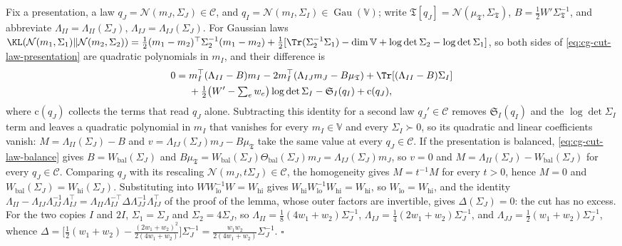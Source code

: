 Fix a presentation, a law $q_J=\mathcal N(m_J,\Sigma_J)\in\mathscr C$, and $q_I=\mathcal N(m_I,\Sigma_I)\in\operatorname{Gau}(\mathbb V)$;
write $\mathfrak T[q_J]=\mathcal N(\mu_{\mathfrak T},\Sigma_{\mathfrak T})$, $B=\tfrac12W'\Sigma_{\mathfrak T}^{-1}$, and abbreviate
$\Lambda_{II}=\Lambda_{II}(\Sigma_J)$, $\Lambda_{IJ}=\Lambda_{IJ}(\Sigma_J)$. For Gaussian laws
$\KL(\mathcal N(m_1,\Sigma_1)\Vert\mathcal N(m_2,\Sigma_2))=\tfrac12(m_1-m_2)^\top\Sigma_2^{-1}(m_1-m_2)
+\tfrac12[\Tr(\Sigma_2^{-1}\Sigma_1)-\dim\mathbb V+\log\det\Sigma_2-\log\det\Sigma_1]$, so both sides of
\eqref{eq:cg-cut-law-presentation} are quadratic polynomials in $m_I$, and their difference is
\begin{align*}
0={}&m_I^\top(\Lambda_{II}-B)m_I-2m_I^\top(\Lambda_{IJ}m_J-B\mu_{\mathfrak T})+\Tr[(\Lambda_{II}-B)\Sigma_I]\\
&+\tfrac12\bigl(W'-\textstyle\sum_ew_e\bigr)\log\det\Sigma_I-\mathfrak S_I(q_I)+\mathrm c(q_J),
\end{align*}
where $\mathrm c(q_J)$ collects the terms that read $q_J$ alone. Subtracting this identity for a second law
$q_J'\in\mathscr C$ removes $\mathfrak S_I(q_I)$ and the $\log\det\Sigma_I$ term and leaves a quadratic polynomial in $m_I$
that vanishes for every $m_I\in\mathbb V$ and every $\Sigma_I\succ0$, so its quadratic and linear coefficients
vanish: $M=\Lambda_{II}(\Sigma_J)-B$ and $v=\Lambda_{IJ}(\Sigma_J)m_J-B\mu_{\mathfrak T}$ take the same value at every
$q_J\in\mathscr C$. If the presentation is balanced, \eqref{eq:cg-cut-law-balance} gives
$B=W_{\mathrm{bal}}(\Sigma_J)$ and
$B\mu_{\mathfrak T}=W_{\mathrm{bal}}(\Sigma_J)\Theta_{\mathrm{bal}}(\Sigma_J)m_J=\Lambda_{IJ}(\Sigma_J)m_J$, so $v=0$ and
$M=\Lambda_{II}(\Sigma_J)-W_{\mathrm{bal}}(\Sigma_J)$ for every $q_J\in\mathscr C$. Comparing $q_J$ with its
rescaling $\mathcal N(m_J,t\Sigma_J)\in\mathscr C$, the homogeneity gives $M=t^{-1}M$ for every $t>0$, hence
$M=0$ and $W_{\mathrm{bal}}(\Sigma_J)=W_{\mathrm{hi}}(\Sigma_J)$. Substituting into $WW_{\mathrm{lo}}^{-1}W=W_{\mathrm{hi}}$
gives $W_{\mathrm{hi}}W_{\mathrm{lo}}^{-1}W_{\mathrm{hi}}=W_{\mathrm{hi}}$, so $W_{\mathrm{lo}}=W_{\mathrm{hi}}$, and the
identity $\Lambda_{II}-\Lambda_{IJ}\Lambda_{JJ}^{-1}\Lambda_{IJ}^\top=\Lambda_{II}\Lambda_{IJ}^{-\top}\Delta\Lambda_{JJ}^{-1}\Lambda_{IJ}^\top$
of the proof of the lemma, whose outer factors are invertible, gives $\Delta(\Sigma_J)=0$: the cut has no
excess. For the two copies $I$ and $2I$, $\Sigma_1=\Sigma_J$ and $\Sigma_2=4\Sigma_J$, so
$\Lambda_{II}=\tfrac18(4w_1+w_2)\Sigma_J^{-1}$, $\Lambda_{IJ}=\tfrac14(2w_1+w_2)\Sigma_J^{-1}$, and
$\Lambda_{JJ}=\tfrac12(w_1+w_2)\Sigma_J^{-1}$, whence
$\Delta=\bigl[\tfrac12(w_1+w_2)-\tfrac{(2w_1+w_2)^2}{2(4w_1+w_2)}\bigr]\Sigma_J^{-1}=\frac{w_1w_2}{2(4w_1+w_2)}\Sigma_J^{-1}$.
$\square$

